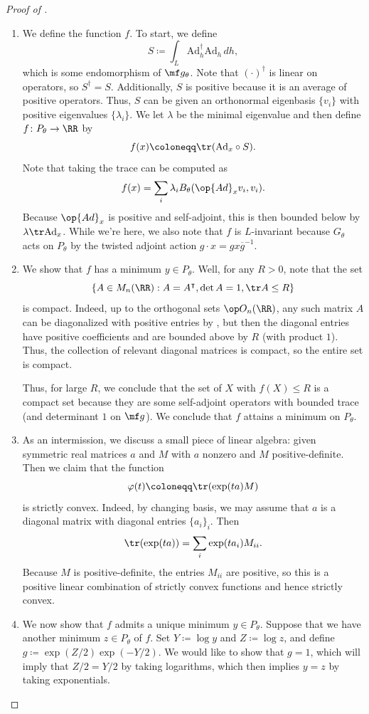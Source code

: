 \documentclass[../notes.tex]{subfiles}
\begin{document}
\begin{proof}[Proof of ]
\begin{enumerate}
		\item We define the function $f$. To start, we define
		\[S\coloneqq\int_L\mathrm{Ad}_h^\dagger\mathrm{Ad}_h\,dh,\]
		which is some endomorphism of $\mf g_\theta$. Note that $(\cdot)^\dagger$ is linear on operators, so $S^\dagger=S$. Additionally, $S$ is positive because it is an average of positive operators. Thus, $S$ can be given an orthonormal eigenbasis $\{v_i\}$ with positive eigenvalues $\{\lambda_i\}$. We let $\lambda$ be the minimal eigenvalue and then define $f\colon P_\theta\to\RR$ by
		\[f(x)\coloneqq\tr(\mathrm{Ad}_x\circ S).\]
		Note that taking the trace can be computed as
		\[f(x)=\sum_i\lambda_iB_\theta(\op{Ad}_xv_i,v_i).\]
		Because $\op{Ad}_x$ is positive and self-adjoint, this is then bounded below by $\lambda\tr\mathrm{Ad}_x$. While we're here, we also note that $f$ is $L$-invariant because $G_\theta$ acts on $P_\theta$ by the twisted adjoint action $g\cdot x=gx\overline g^{-1}$.
		
		\item We show that $f$ has a minimum $y\in P_\theta$. Well, for any $R>0$, note that the set
		\[\{A\in M_n(\RR):A=A^\intercal,\det A=1,\tr A\le R\}\]
		is compact. Indeed, up to the orthogonal sets $\op O_n(\RR)$, any such matrix $A$ can be diagonalized with positive entries by , but then the diagonal entries have positive coefficients and are bounded above by $R$ (with product $1$). Thus, the collection of relevant diagonal matrices is compact, so the entire set is compact.

		Thus, for large $R$, we conclude that the set of $X$ with $f(X)\le R$ is a compact set because they are some self-adjoint operators with bounded trace (and determinant $1$ on $\mf g$). We conclude that $f$ attains a minimum on $P_\theta$.

		\item As an intermission, we discuss a small piece of linear algebra: given symmetric real matrices $a$ and $M$ with $a$ nonzero and $M$ positive-definite. Then we claim that the function
		\[\varphi(t)\coloneqq\tr(\exp(ta)M)\]
		is strictly convex. Indeed, by changing basis, we may assume that $a$ is a diagonal matrix with diagonal entries $\{a_i\}_i$. Then
		\[\tr(\exp(ta))=\sum_i\exp(ta_i)M_{ii}.\]
		Because $M$ is positive-definite, the entries $M_{ii}$ are positive, so this is a positive linear combination of strictly convex functions and hence strictly convex.

		\item We now show that $f$ admits a unique minimum $y\in P_\theta$. Suppose that we have another minimum $z\in P_\theta$ of $f$. Set $Y\coloneqq\log y$ and $Z\coloneqq\log z$, and define $g\coloneqq\exp(Z/2)\exp(-Y/2)$. We would like to show that $g=1$, which will imply that $Z/2=Y/2$ by taking logarithms, which then implies $y=z$ by taking exponentials.


\end{enumerate}
\end{proof}
\end{document}
